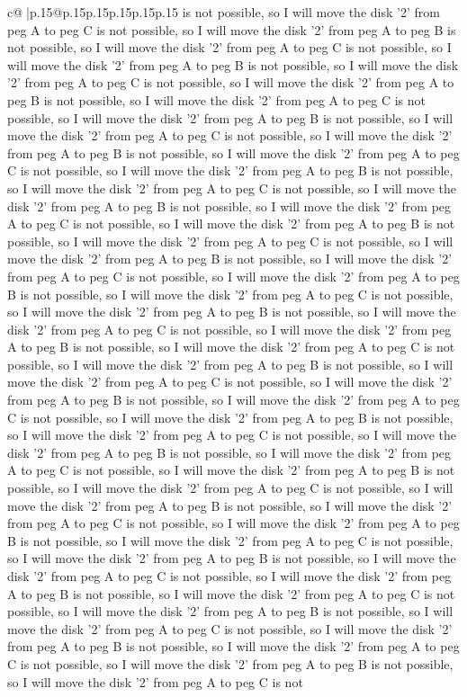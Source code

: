 \documentclass{article}
\begin{document}
{\begin{supertabular}{c@{$\;$}|p{.15\linewidth}@{}p{.15\linewidth}p{.15\linewidth}p{.15\linewidth}p{.15\linewidth}p{.15\linewidth}}
{{{is not possible, so I will move the disk '2' from peg A to peg C is not possible, so I will move the disk '2' from peg A to peg B is not possible, so I will move the disk '2' from peg A to peg C is not possible, so I will move the disk '2' from peg A to peg B is not possible, so I will move the disk '2' from peg A to peg C is not possible, so I will move the disk '2' from peg A to peg B is not possible, so I will move the disk '2' from peg A to peg C is not possible, so I will move the disk '2' from peg A to peg B is not possible, so I will move the disk '2' from peg A to peg C is not possible, so I will move the disk '2' from peg A to peg B is not possible, so I will move the disk '2' from peg A to peg C is not possible, so I will move the disk '2' from peg A to peg B is not possible, so I will move the disk '2' from peg A to peg C is not possible, so I will move the disk '2' from peg A to peg B is not possible, so I will move the disk '2' from peg A to peg C is not possible, so I will move the disk '2' from peg A to peg B is not possible, so I will move the disk '2' from peg A to peg C is not possible, so I will move the disk '2' from peg A to peg B is not possible, so I will move the disk '2' from peg A to peg C is not possible, so I will move the disk '2' from peg A to peg B is not possible, so I will move the disk '2' from peg A to peg C is not possible, so I will move the disk '2' from peg A to peg B is not possible, so I will move the disk '2' from peg A to peg C is not possible, so I will move the disk '2' from peg A to peg B is not possible, so I will move the disk '2' from peg A to peg C is not possible, so I will move the disk '2' from peg A to peg B is not possible, so I will move the disk '2' from peg A to peg C is not possible, so I will move the disk '2' from peg A to peg B is not possible, so I will move the disk '2' from peg A to peg C is not possible, so I will move the disk '2' from peg A to peg B is not possible, so I will move the disk '2' from peg A to peg C is not possible, so I will move the disk '2' from peg A to peg B is not possible, so I will move the disk '2' from peg A to peg C is not possible, so I will move the disk '2' from peg A to peg B is not possible, so I will move the disk '2' from peg A to peg C is not possible, so I will move the disk '2' from peg A to peg B is not possible, so I will move the disk '2' from peg A to peg C is not possible, so I will move the disk '2' from peg A to peg B is not possible, so I will move the disk '2' from peg A to peg C is not possible, so I will move the disk '2' from peg A to peg B is not possible, so I will move the disk '2' from peg A to peg C is not possible, so I will move the disk '2' from peg A to peg B is not possible, so I will move the disk '2' from peg A to peg C is not possible, so I will move the disk '2' from peg A to peg B is not possible, so I will move the disk '2' from peg A to peg C is not possible, so I will move the disk '2' from peg A to peg B is not possible, so I will move the disk '2' from peg A to peg C is not possible, so I will move the disk '2' from peg A to peg B is not possible, so I will move the disk '2' from peg A to peg C is not }}}
\end{supertabular}}
\end{document}
